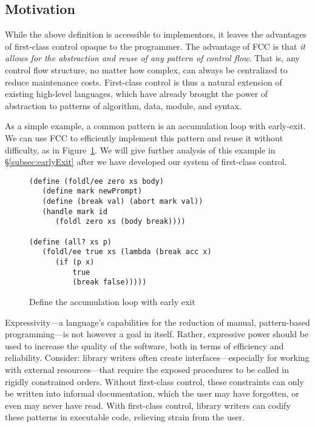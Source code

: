 \documentclass[11pt]{article}
\newcommand{\maybePage}{\newpage}
\begin{document}

\maybePage
\subsection{Motivation}

While the above definition is accessible to implementors, it leaves the advantages of first-class control opaque to the programmer.
The advantage of FCC is that \emph{it allows for the abstraction and reuse of any pattern of control flow}.
That is, any control flow structure, no matter how complex, can always be centralized to reduce maintenance costs.
First-class control is thus a natural extension of existing high-level languages, which have already brought the power of abstraction to patterns of algorithm, data, module, and syntax.

As a simple example, a common pattern is an accumulation loop with early-exit.
We can use FCC to efficiently implement this pattern and reuse it without difficulty, as in Figure~\ref{fig:ex-foldl/ee}.
We will give further analysis of this example in \S\ref{subsec:earlyExit} after we have developed our system of first-class control.

\begin{figure}[H]
\caption{Define the accumulation loop with early exit}
\label{fig:ex-foldl/ee}
\begin{verbatim}
(define (foldl/ee zero xs body)
   (define mark newPrompt)
   (define (break val) (abort mark val))
   (handle mark id
      (foldl zero xs (body break))))

(define (all? xs p)
   (foldl/ee true xs (lambda (break acc x)
      (if (p x)
          true
          (break false)))))
\end{verbatim}
\end{figure}

Expressivity---a language's capabilities for the reduction of manual, pattern-based programming---is not however a goal in itself.
Rather, expressive power should be used to increase the quality of the software, both in terms of efficiency and reliability.
Consider: library writers often create interfaces---especially for working with external resources---that require the exposed procedures to be called in rigidly constrained orders.
Without first-class control, these constraints can only be written into informal documentation, which the user may have forgotten, or even may never have read.
With first-class control, library writers can codify these patterns in executable code, relieving strain from the user.
\end{document}

